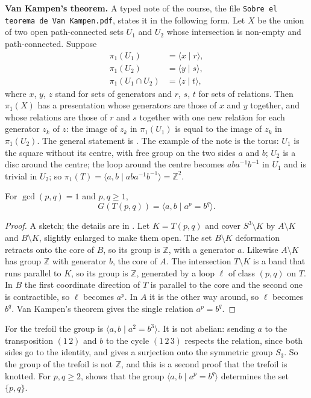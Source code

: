 \medskip\noindent
{\bf Van Kampen's theorem.} A typed
note of the course, the file
{\tt Sobre el teorema de Van
Kampen.pdf}, states it in the following
form. Let $X$ be the union of two open
path-connected sets $U_1$ and $U_2$
whose intersection is non-empty and
path-connected. Suppose
$$
\begin{aligned}
\pi_1(U_1)
&=\langle x\mid r\rangle,\\
\pi_1(U_2)
&=\langle y\mid s\rangle,\\
\pi_1(U_1\cap U_2)
&=\langle z\mid t\rangle,
\end{aligned}
$$
where $x$, $y$, $z$ stand for sets of
generators and $r$, $s$, $t$ for sets
of relations. Then $\pi_1(X)$ has a
presentation whose generators are those
of $x$ and $y$ together, and whose
relations are those of $r$ and $s$
together with one new relation for each
generator $z_k$ of $z$: the image of
$z_k$ in $\pi_1(U_1)$ is equal to the
image of $z_k$ in $\pi_1(U_2)$. The
general statement is
\cite[Theorem 1.20]{hatcher}. The
example of the note is the torus: $U_1$
is the square without its centre, with
free group on the two sides $a$ and
$b$; $U_2$ is a disc around the centre;
the loop around the centre becomes
$aba^{-1}b^{-1}$ in $U_1$ and is
trivial in $U_2$; so
$\pi_1(T)=\langle a,b\mid
aba^{-1}b^{-1}\rangle=\mathbb{Z}^2$.

\begin{theorem}
\label{theorem-torus-knot-group}
For $\gcd(p,q)=1$ and $p,q\geq 1$,
$$
G(T(p,q))
=\langle a,b\mid a^{p}=b^{q}\rangle.
$$
\end{theorem}

\begin{proof}
A sketch; the details are in
\cite[Example 1.24]{hatcher}. Let
$K=T(p,q)$ and cover $S^3\setminus K$
by $A\setminus K$ and $B\setminus K$,
slightly enlarged to make them open.
The set $B\setminus K$ deformation
retracts onto the core of $B$, so its
group is $\mathbb{Z}$, with a generator
$a$. Likewise $A\setminus K$ has group
$\mathbb{Z}$ with generator $b$, the
core of $A$. The intersection
$T\setminus K$ is a band that runs
parallel to $K$, so its group is
$\mathbb{Z}$, generated by a loop
$\ell$ of class $(p,q)$ on $T$. In $B$
the first coordinate direction of $T$
is parallel to the core and the second
one is contractible, so $\ell$ becomes
$a^{p}$. In $A$ it is the other way
around, so $\ell$ becomes $b^{q}$. Van
Kampen's theorem gives the single
relation $a^{p}=b^{q}$.
\end{proof}

\noindent
For the trefoil the group is
$\langle a,b\mid a^{2}=b^{3}\rangle$.
It is not abelian: sending $a$ to the
transposition $(1\,2)$ and $b$ to the
cycle $(1\,2\,3)$ respects the
relation, since both sides go to the
identity, and gives a surjection onto
the symmetric group $S_3$. So the group
of the trefoil is not $\mathbb{Z}$, and
this is a second proof that the trefoil
is knotted. For $p,q\geq 2$,
\cite[Example 1.24]{hatcher} shows that
the group $\langle a,b\mid
a^{p}=b^{q}\rangle$ determines the set
$\{p,q\}$.

